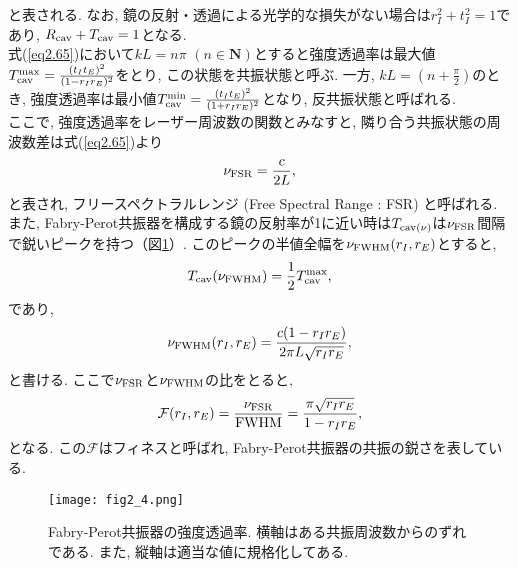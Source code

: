 と表される. なお, 鏡の反射・透過による光学的な損失がない場合は$r_I^2+t_I^2=1$であり, $R_{\rm cav}+T_{\rm cav}=1$となる. \\
\quad 式(\ref{eq2.65})において$kL=n\pi\,\,(n\in{\bm{N}})$とすると強度透過率は最大値$T_{\rm cav}^{\rm max}=\frac{(t_It_E)^2}{(1-r_Ir_E)^2}$をとり, この状態を共振状態と呼ぶ. 一方, $kL=(n+\frac{\pi}{2})$のとき, 強度透過率は最小値$T_{\rm cav}^{\rm min}=\frac{(t_It_E)^2}{(1+r_Ir_E)^2}$となり, 反共振状態と呼ばれる. \\
\quad ここで, 強度透過率をレーザー周波数の関数とみなすと, 隣り合う共振状態の周波数差は式(\ref{eq2.65})より
\begin{equation}
\nu_{\rm FSR}=\frac{c}{2L},
\end{equation}
と表され, フリースペクトラルレンジ (Free Spectral Range : FSR) と呼ばれる. また, Fabry-Perot共振器を構成する鏡の反射率が1に近い時は$T_{\rm cav(\nu)}$は$\nu_{\rm FSR}$間隔で鋭いピークを持つ（図\ref{fig2.4}）. このピークの半値全幅を$\nu_{\rm FWHM}(r_I,r_E)$とすると, 
\begin{equation}
T_{\rm cav}(\nu_{\rm FWHM})=\frac{1}{2}T_{\rm cav}^{\rm max},
\end{equation}
であり, 
\begin{equation}
\nu_{\rm FWHM}(r_I,r_E)=\frac{c(1-r_Ir_E)}{2\pi L\sqrt{r_Ir_E}},
\end{equation}
と書ける. ここで$\nu_{\rm FSR}$と$\nu_{\rm FWHM}$の比をとると, 
\begin{equation}
\mathcal{F}(r_I,r_E)=\frac{\nu_{\rm FSR}}{\rm FWHM}=\frac{\pi\sqrt{r_Ir_E}}{1-r_Ir_E},
\label{eq2.70}
\end{equation}
となる. この$\mathcal{F}$はフィネスと呼ばれ, Fabry-Perot共振器の共振の鋭さを表している. 
\begin{figure}[H]
\begin{center}
\texttt{[image: fig2\_4.png]}
\caption[Fabry-Perot共振器の強度透過率]{Fabry-Perot共振器の強度透過率. 横軸はある共振周波数からのずれである. また, 縦軸は適当な値に規格化してある. }
\label{fig2.4}
\end{center}
\end{figure}
